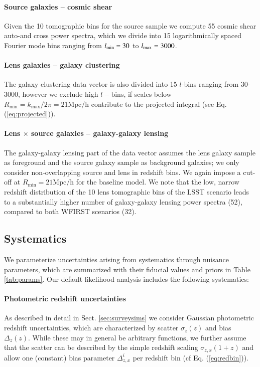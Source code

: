 \documentclass[fleqn,usenatbib,useAMS]{mnras}
\newcommand{\mr}{\mathrm}
\begin{document}
\paragraph*{Source galaxies -- cosmic shear}
Given the 10 tomographic bins for the source sample we compute 55 cosmic shear auto-and cross power spectra, which we divide into 15 logarithmically spaced Fourier mode bins ranging from $l_{\rm{min}} = 30$ to $l_{\rm{max}} = 3000$. 

\paragraph*{Lens galaxies -- galaxy clustering}
The galaxy clustering data vector is also divided into 15 $l$-bins ranging from 30-3000, however we exclude high $l-$bins, if scales below $R_\mr{\min}=k_\mr{max}/2 \pi=21 \mr{ Mpc/h}$ contribute to the projected integral (see Eq. (\ref{eq:projected})).  

\paragraph*{Lens $\times$ source galaxies -- galaxy-galaxy lensing}
The galaxy-galaxy lensing part of the data vector assumes the lens galaxy sample as foreground and the source galaxy sample as background galaxies; we only consider non-overlapping source and lens in redshift bins. We again impose a cut-off at $R_\mr{\min}=21 \mr{ Mpc/h}$ for the baseline model. We note that the low, narrow redshift distribution of the 10 lens tomographic bins of the LSST scenario leads to a substantially higher number of galaxy-galaxy lensing power spectra (52), compared to both WFIRST scenarios (32).


\subsection{Systematics} 
\label{sec:sys}
We parameterize uncertainties arising from systematics through nuisance parameters, which are summarized with their fiducial values and priors in Table \ref{tab:params}. Our default likelihood analysis includes the following systematics:

\paragraph*{Photometric redshift uncertainties} As described in detail in Sect. \ref{sec:surveysims}
we consider Gaussian photometric redshift uncertainties, which are characterized by scatter $\sigma_z(z)$ and bias $\Delta_z(z)$. While these may in general be arbitrary functions, we further assume that the scatter can be described by the simple redshift scaling $\sigma_{z,x}(1+z)$ and allow one (constant) bias parameter $\Delta^i_{z,x}$ per redshift bin (cf Eq. (\ref{eq:redbin})).
\end{document}
